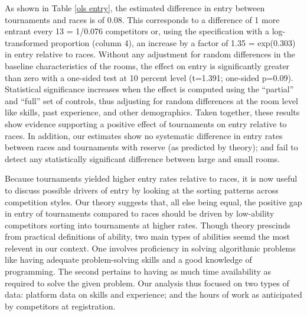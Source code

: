 \documentclass[10pt, titlepage]{article}
\begin{document}
As shown in Table \ref{ols entry}, the estimated difference in entry
between tournaments and races is of 0.08. This corresponds to a
difference of 1 more entrant every 13 = 1/0.076 competitors or, using
the specification with a log-transformed proportion (column 4), an
increase by a factor of 1.35 = exp(0.303) in entry relative to races.
Without any adjustment for random differences in the baseline
characteristics of the rooms, the effect on entry is significantly
greater than zero with a one-sided test at 10 percent level (t=1.391;
one-sided p=0.09). Statistical significance increases when the effect is
computed using the ``partial'' and ``full'' set of controls, thus
adjusting for random differences at the room level like skills, past
experience, and other demographics. Taken together, these results show
evidence supporting a positive effect of tournaments on entry relative
to races. In addition, our estimates show no systematic difference in
entry rates between races and tournaments with reserve (as predicted by
theory); and fail to detect any statistically significant difference
between large and small rooms.

Because tournaments yielded higher entry rates relative to races, it is
now useful to discuss possible drivers of entry by looking at the
sorting patterns across competition styles. Our theory suggests that,
all else being equal, the positive gap in entry of tournaments compared
to races should be driven by low-ability competitors sorting into
tournaments at higher rates. Though theory prescinds from practical
definitions of ability, two main types of abilities seemd the most
relevent in our context. One involves proficiency in solving algorithmic
problems like having adequate problem-solving skills and a good
knowledge of programming. The second pertains to having as much time
availability as required to solve the given problem. Our analysis thus
focused on two types of data: platform data on skills and experience;
and the hours of work as anticipated by competitors at registration.
\end{document}
